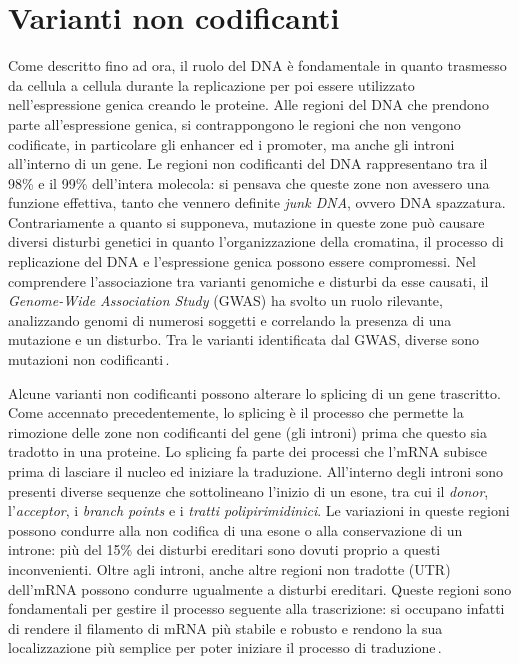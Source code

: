 \section{Varianti non codificanti}

Come descritto fino ad ora, il ruolo del \acs{DNA} è fondamentale in quanto trasmesso da cellula a cellula durante la replicazione per poi essere utilizzato nell'espressione genica creando le proteine. Alle regioni del \acs{DNA} che prendono parte all'espressione genica, si contrappongono le regioni che non vengono codificate, in particolare gli enhancer ed i promoter, ma anche gli introni all'interno di un gene. Le regioni non codificanti del \acs{DNA} rappresentano tra il 98\% e il 99\% dell'intera molecola: si pensava che queste zone non avessero una funzione effettiva, tanto che vennero definite \textit{junk \acs{DNA}}, ovvero \acs{DNA} spazzatura. Contrariamente a quanto si supponeva, mutazione in queste zone può causare diversi disturbi genetici in quanto l'organizzazione della cromatina, il processo di replicazione del \acs{DNA} e l'espressione genica possono essere compromessi. Nel comprendere l'associazione tra varianti genomiche e disturbi da esse causati, il \textit{Genome-Wide Association Study} (\acs{GWAS}) ha svolto un ruolo rilevante, analizzando genomi di numerosi soggetti e correlando la presenza di una mutazione e un disturbo. Tra le varianti identificata dal \acs{GWAS}, diverse sono mutazioni non codificanti\,\cite{visscher2012five, zhang2015non, ludwig2002functional}.

Alcune varianti non codificanti possono alterare lo splicing di un gene trascritto. Come accennato precedentemente, lo splicing è il processo che permette la rimozione delle zone non codificanti del gene (gli introni) prima che questo sia tradotto in una proteine. Lo splicing fa parte dei processi che l'\acs{mRNA} subisce prima di lasciare il nucleo ed iniziare la traduzione. All'interno degli introni sono presenti diverse sequenze che sottolineano l'inizio di un esone, tra cui il \textit{donor}, l'\textit{acceptor}, i \textit{branch points} e i \textsl{tratti polipirimidinici}. Le variazioni in queste regioni possono condurre alla non codifica di una esone o alla conservazione di un introne: più del 15\% dei disturbi ereditari sono dovuti proprio a questi inconvenienti. Oltre agli introni, anche altre regioni non tradotte (\acs{UTR}) dell'\acs{mRNA} possono condurre ugualmente a disturbi ereditari. Queste regioni sono fondamentali per gestire il processo seguente alla trascrizione: si occupano infatti di rendere il filamento di \acs{mRNA} più stabile e robusto e rendono la sua localizzazione più semplice per poter iniziare il processo di traduzione\,\cite{khurana2016role, french2020role}. 

